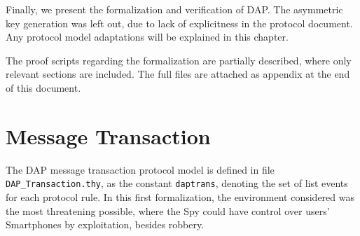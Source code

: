 Finally, we present the formalization and verification of DAP\@. The asymmetric key generation was left out, due to lack of explicitness in the protocol document. Any protocol model adaptations will be explained in this chapter.

The proof scripts regarding the formalization are partially described, where only relevant sections are included. The full files are attached as appendix at the end of this document.

\section{Message Transaction}
The DAP message transaction protocol model is defined in file \texttt{DAP_Transaction.thy}, as the constant \texttt{daptrans}, denoting the set of list events for each protocol rule. In this first formalization, the environment considered was the most threatening possible, where the Spy could have control over users' Smartphones by exploitation, besides robbery.
